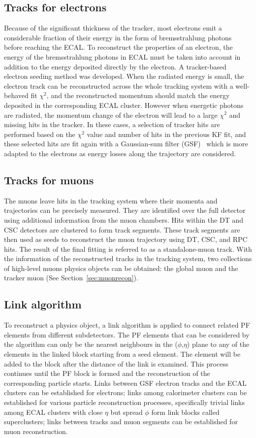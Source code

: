\subsection{Tracks for electrons}
Because of the significant thickness of the tracker, most electrons emit a considerable fraction of their energy in the form of bremsstrahlung photons before reaching the ECAL. To reconstruct the properties of an electron, the energy of the bremsstrahlung photons in ECAL must be taken into account in addition to the energy deposited directly by the electron. A tracker-based electron seeding method was developed. When the radiated energy is small, the electron track can be reconstructed across the whole tracking system with a well-behaved fit $\chi^2$, and the reconstructed momentum should match the energy deposited in the corresponding ECAL cluster. However when energetic photons are radiated, the momentum change of the electron will lead to a large $\chi^2$ and missing hits in the tracker. In these cases, a selection of tracker hits are performed based on the $\chi^2$ value and number of hits in the previous KF fit, and these selected hits are fit again with a Gaussian-sum filter (GSF)~\cite{ob_electronconst} which is more adapted to the electrons as energy losses along the trajectory are considered. 

\subsection{Tracks for muons}
The muons leave hits in the tracking system where their momenta and trajectories can be precisely measured. They are identified over the full detector using additional information from the muon chambers. Hits within the DT and CSC detectors are clustered to form track segments. These track segments are then used as seeds to reconstruct the muon trajectory using DT, CSC, and RPC hits. The result of the final fitting is referred to as a standalone-muon track. With the information of the reconstructed tracks in the tracking system, two collections of high-level muons physics objects can be obtained: the global muon and the tracker muon (See Section~\ref{sec:muonrecon}).

\subsection{Link algorithm}
To reconstruct a physics object, a link algorithm is applied to connect related PF elements from different subdetectors. The PF elements that can be considered by the algorithm can only be the nearest neighbours in the ($\phi$,$\eta$) plane to any of the elements in the linked block starting from a seed element. The element will be added to the block after the distance of the link is examined. This process continues until the PF block is formed and the reconstruction of the corresponding particle starts. Links between GSF electron tracks and the ECAL clusters can be established for electrons; links among calorimeter clusters can be established for various particle reconstruction processes, specifically trivial links among ECAL clusters with close $\eta$ but spread $\phi$ form link blocks called superclusters; links between tracks and muon segments can be established for muon reconstruction.

